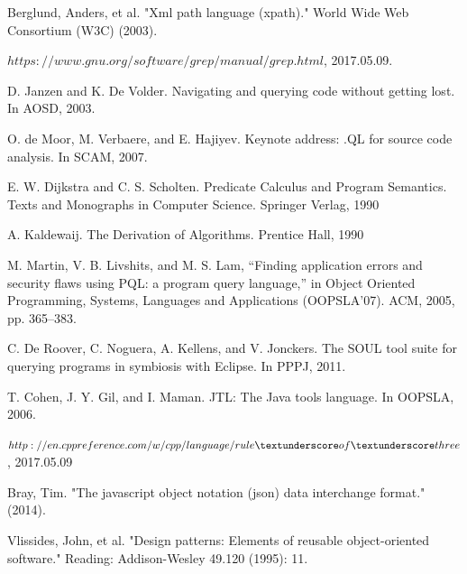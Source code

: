 \documentclass[a4paper,12pt]{report}
\begin{document}
\begin{thebibliography}{99}
	 Berglund, Anders, et al. "Xml path language (xpath)." World Wide Web Consortium (W3C) (2003).
	
	 $https://www.gnu.org/software/grep/manual/grep.html$, 2017.05.09.
	
	 D. Janzen and K. De Volder. Navigating and querying code
	without getting lost. In AOSD, 2003.
	
	 O. de Moor, M. Verbaere, and E. Hajiyev. Keynote address:
	.QL for source code analysis. In SCAM, 2007.
	
	E. W. Dijkstra and C. S. Scholten. Predicate Calculus and
	Program Semantics. Texts and Monographs in Computer
	Science. Springer Verlag, 1990
	
	A. Kaldewaij. The Derivation of Algorithms. Prentice Hall,
	1990
	
	  M. Martin, V. B. Livshits, and M. S. Lam, “Finding application
	errors and security flaws using PQL: a program query language,” 
	in Object Oriented Programming, Systems, Languages and Applications (OOPSLA’07). ACM, 2005, pp.	365–383.
	
	 C. De Roover, C. Noguera, A. Kellens, and V. Jonckers. The
	SOUL tool suite for querying programs in symbiosis with
	Eclipse. In PPPJ, 2011.
	
	 T. Cohen, J. Y. Gil, and I. Maman. JTL: The Java tools
	language. In OOPSLA, 2006.
	
	 $http://en.cppreference.com/w/cpp/language/rule\textunderscore of\textunderscore three$ , 2017.05.09
	
	Bray, Tim. "The javascript object notation (json) data interchange format." (2014).
	
	 Vlissides, John, et al. "Design patterns: Elements of reusable object-oriented software." Reading: Addison-Wesley 49.120 (1995): 11.
	
\end{thebibliography}
	
\end{document}
